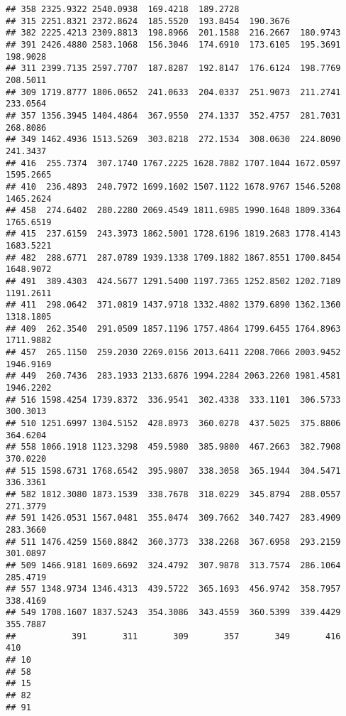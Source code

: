 \documentclass[
]{article}
\begin{document}
\begin{verbatim}
## 358 2325.9322 2540.0938  169.4218  189.2728                              
## 315 2251.8321 2372.8624  185.5520  193.8454  190.3676                    
## 382 2225.4213 2309.8813  198.8966  201.1588  216.2667  180.9743          
## 391 2426.4880 2583.1068  156.3046  174.6910  173.6105  195.3691  198.9028
## 311 2399.7135 2597.7707  187.8287  192.8147  176.6124  198.7769  208.5011
## 309 1719.8777 1806.0652  241.0633  204.0337  251.9073  211.2741  233.0564
## 357 1356.3945 1404.4864  367.9550  274.1337  352.4757  281.7031  268.8086
## 349 1462.4936 1513.5269  303.8218  272.1534  308.0630  224.8090  241.3437
## 416  255.7374  307.1740 1767.2225 1628.7882 1707.1044 1672.0597 1595.2665
## 410  236.4893  240.7972 1699.1602 1507.1122 1678.9767 1546.5208 1465.2624
## 458  274.6402  280.2280 2069.4549 1811.6985 1990.1648 1809.3364 1765.6519
## 415  237.6159  243.3973 1862.5001 1728.6196 1819.2683 1778.4143 1683.5221
## 482  288.6771  287.0789 1939.1338 1709.1882 1867.8551 1700.8454 1648.9072
## 491  389.4303  424.5677 1291.5400 1197.7365 1252.8502 1202.7189 1191.2611
## 411  298.0642  371.0819 1437.9718 1332.4802 1379.6890 1362.1360 1318.1805
## 409  262.3540  291.0509 1857.1196 1757.4864 1799.6455 1764.8963 1711.9882
## 457  265.1150  259.2030 2269.0156 2013.6411 2208.7066 2003.9452 1946.9169
## 449  260.7436  283.1933 2133.6876 1994.2284 2063.2260 1981.4581 1946.2202
## 516 1598.4254 1739.8372  336.9541  302.4338  333.1101  306.5733  300.3013
## 510 1251.6997 1304.5152  428.8973  360.0278  437.5025  375.8806  364.6204
## 558 1066.1918 1123.3298  459.5980  385.9800  467.2663  382.7908  370.0220
## 515 1598.6731 1768.6542  395.9807  338.3058  365.1944  304.5471  336.3361
## 582 1812.3080 1873.1539  338.7678  318.0229  345.8794  288.0557  271.3779
## 591 1426.0531 1567.0481  355.0474  309.7662  340.7427  283.4909  283.3660
## 511 1476.4259 1560.8842  360.3773  338.2268  367.6958  293.2159  301.0897
## 509 1466.9181 1609.6692  324.4792  307.9878  313.7574  286.1064  285.4719
## 557 1348.9734 1346.4313  439.5722  365.1693  456.9742  358.7957  338.4169
## 549 1708.1607 1837.5243  354.3086  343.4559  360.5399  339.4429  355.7887
##           391       311       309       357       349       416       410
## 10                                                                       
## 58                                                                       
## 15                                                                       
## 82                                                                       
## 91                                                                       

\end{verbatim}
\end{document}
